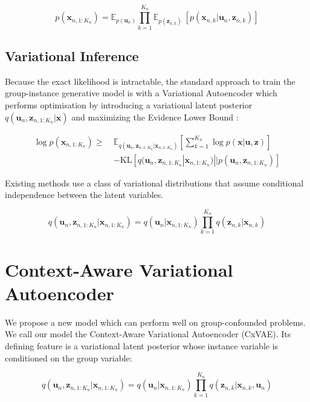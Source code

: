 \documentclass{article} %
\begin{document}
\begin{equation}
p(\mathbf{x}_{n, 1:K_n}) = \mathbb{E}_{p(\mathbf{u}_n)}  \prod_{k=1}^{K_n} \mathbb{E}_{p(\mathbf{z}_{n,k})} ~ [p(\mathbf{x}_{n,k} | \mathbf{u}_n, \mathbf{z}_{n,k})]
\end{equation}

\subsection{Variational Inference}

Because the exact likelihood is intractable, the standard approach to train the group-instance generative model is with a Variational Autoencoder \citep{Kingma2014AutoEncodingVB,JimenezRezende2014StochasticBA} which performs optimisation by introducing a variational latent posterior $q(\mathbf{u}_n, \mathbf{z}_{n, 1:K_n} | \mathbf{x})$ and maximizing the Evidence Lower Bound \citep{Jordan2004AnIT}:

\begin{align}
\log p(\mathbf{x}_{n,1:K_n}) \geq ~ & \mathbb{E}_{q(\mathbf{u}_n, \mathbf{z}_{n, 1:K_n} | \mathbf{x}_{n, 1:K_n} )} \left[\sum_{k=1}^{K_n} \log p(\mathbf{x} | \mathbf{u}, \mathbf{z})\right] \\ &- \mathrm{KL} [q(\mathbf{u}_n, \mathbf{z}_{n, 1:K_n}  | \mathbf{x}_{n, 1:K_n} ) || p(\mathbf{u}_n, \mathbf{z}_{n, 1:K_n} )]
\end{align}

Existing methods use a class of variational distributions that assume conditional independence between the latent variables.

\begin{equation}
q(\mathbf{u}_n, \mathbf{z}_{n, 1:K_n}  | \mathbf{x}_{n, 1:K_n} ) = q(\mathbf{u}_n | \mathbf{x}_{n, 1:K_n} ) \prod_{k=1}^{K_n} q(\mathbf{z}_{n,k} | \mathbf{x}_{n,k})
\end{equation}

\section{Context-Aware Variational Autoencoder}

We propose a new model which can perform well on group-confounded problems. We call our model the Context-Aware Variational Autoencoder (CxVAE). Its defining feature is a variational latent posterior whose instance variable is conditioned on the group variable:

\begin{equation}
q(\mathbf{u}_n, \mathbf{z}_{n, 1:K_n}  | \mathbf{x}_{n, 1:K_n} ) = q(\mathbf{u}_n | \mathbf{x}_{n, 1:K_n} ) \prod_{k=1}^{K_n} q(\mathbf{z}_{n,k} | \mathbf{x}_{n,k},  \mathbf{u}_n)
\end{equation}
\end{document}
